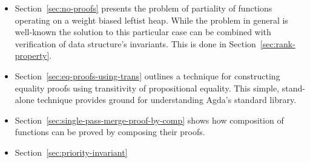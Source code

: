 \begin{itemize}
 \item Section~\ref{sec:no-proofs} presents the problem of partiality of functions operating on a weight biased leftist heap. While the problem in general is well-known the solution to this particular case can be combined with verification of data structure's invariants. This is done in Section~\ref{sec:rank-property}.
 \item Section~\ref{sec:eq-proofs-using-trans} outlines a technique for constructing equality proofs using transitivity of propositional equality. This simple, stand-alone technique provides ground for understanding Agda's standard library.
 \item Section~\ref{sec:single-pass-merge-proof-by-comp} shows how composition of functions can be proved by composing their proofs.
 \item Section~\ref{sec:priority-invariant}
\end{itemize}
